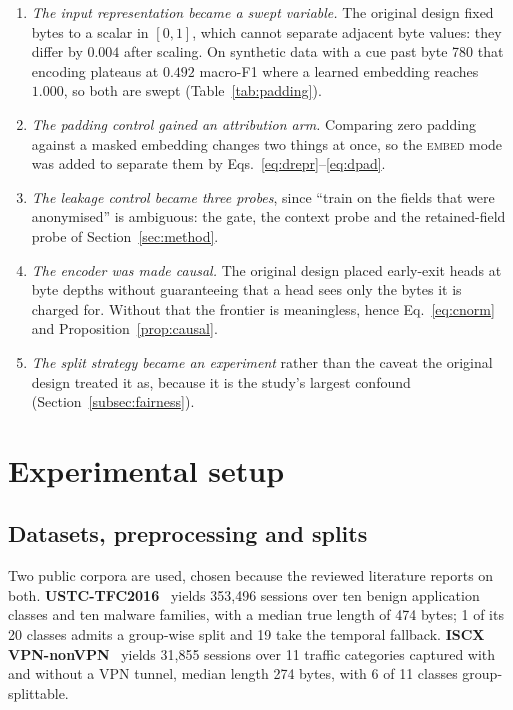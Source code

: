 \documentclass[pdflatex,sn-mathphys-num]{sn-jnl}
\theoremstyle{thmstyleone}%
\theoremstyle{thmstylethree}%
\begin{document}
\begin{enumerate}
\item \emph{The input representation became a swept variable.} The original
design fixed bytes to a scalar in $[0,1]$, which cannot separate adjacent byte
values: they differ by $0.004$ after scaling. On synthetic data with a cue past
byte 780 that encoding plateaus at $0.492$ macro-F1 where a learned embedding
reaches $1.000$, so both are swept (Table~\ref{tab:padding}).
\item \emph{The padding control gained an attribution arm.} Comparing zero
padding against a masked embedding changes two things at once, so the
\textsc{embed} mode was added to separate them by
Eqs.~\eqref{eq:drepr}--\eqref{eq:dpad}.
\item \emph{The leakage control became three probes}, since ``train on the
fields that were anonymised'' is ambiguous: the gate, the context probe and
the retained-field probe of Section~\ref{sec:method}.
\item \emph{The encoder was made causal.} The original design placed
early-exit heads at byte depths without guaranteeing that a head sees only the
bytes it is charged for. Without that the frontier is meaningless, hence
Eq.~\eqref{eq:cnorm} and Proposition~\ref{prop:causal}.
\item \emph{The split strategy became an experiment} rather than the caveat
the original design treated it as, because it is the study's largest confound
(Section~\ref{subsec:fairness}).
\end{enumerate}

\section{Experimental setup}\label{sec:setup}

\subsection{Datasets, preprocessing and splits}

Two public corpora are used, chosen because the reviewed literature reports on
both. \textbf{USTC-TFC2016}~\cite{ustc} yields 353{,}496 sessions over ten
benign application classes and ten malware families, with a median true length
of 474 bytes; 1 of its 20 classes admits a group-wise split and 19 take the
temporal fallback. \textbf{ISCX VPN-nonVPN}~\cite{iscx} yields 31{,}855
sessions over 11 traffic categories captured with and without a VPN tunnel,
median length 274 bytes, with 6 of 11 classes group-splittable.
\end{document}
